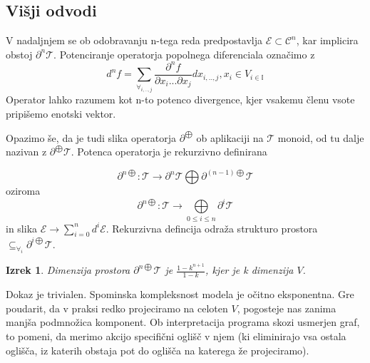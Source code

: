 \documentclass{article}
\newcommand{\II}{\mathbb{I}}
\newcommand{\E}{\mathcal{E}}
\newcommand{\T}{\mathcal{T}}
\newcommand{\Op}{\partial^{\bigoplus}}
\newcommand{\op}[1]{\partial^{#1\bigoplus}}
\newtheorem{izrek}{Izrek}[section]
\begin{document}
 \subsection{Višji odvodi}
 
 V nadaljnjem se ob odobravanju n-tega reda predpostavlja $\E\subset\mathcal{C}^n$, kar implicira obstoj $\partial^n\T$. Potenciranje operatorja popolnega diferenciala označimo z
 $$d^nf=\sum_{\forall_{i,..,j}}\frac{\partial^n f}{\partial x_i...\partial x_j}dx_{i,..,j}, x_i\in V_{i\in\II}$$
 Operator lahko razumem kot n-to potenco divergence, kjer vsakemu členu vsote pripišemo enotski vektor.
 
 Opazimo še, da je tudi slika operatorja $\partial^{\bigoplus}$ ob aplikaciji na $\T$ monoid, od tu dalje nazivan z $\partial^{\bigoplus}\T$. Potenca operatorja je rekurzivno definirana
 
 \begin{equation}\label{eq:dirSumFunNRek}
	\partial^{n\bigoplus}:\T\to\partial^{n}\T\bigoplus\partial^{(n-1)\bigoplus}\T
 \end{equation}
 oziroma
 \begin{equation}\label{eq:dirSumFunN}
 	\partial^{n\bigoplus}:\T\to\bigoplus\limits_{0\leq i\leq n}\partial^{i}\T
  \end{equation}
 in slika $\E\to\sum\limits_{i=0}^nd^i\E$. Rekurzivna defincija odraža strukturo prostora $\subseteq_{\forall_i}\op{i}\T$.
 \begin{izrek}
 Dimenzija prostora $\op{n}\T$ je $\frac{1-k^{n+1}}{1-k}$, kjer je k dimenzija $V$.
 \end{izrek}
 
 Dokaz je trivialen. Spominska kompleksnost modela je očitno eksponentna. Gre poudarit, da v praksi redko projeciramo na celoten $V$, pogosteje nas zanima manjša podmnožica komponent. Ob interpretacija programa skozi usmerjen graf, to pomeni, da merimo akcijo specifični oglišč v njem (ki eliminirajo vsa ostala oglišča, iz katerih obstaja pot do oglišča na katerega že projeciramo).
 
 
\end{document}
